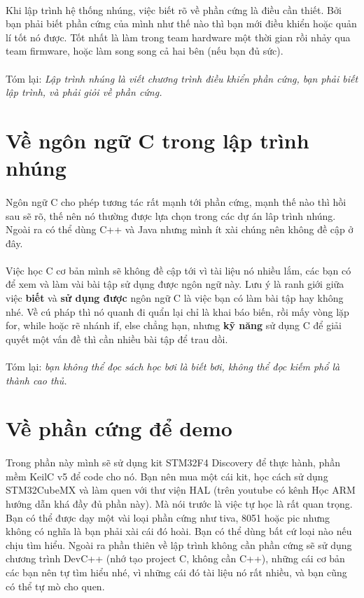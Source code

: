 \documentclass[12pt,a5paper]{book}
\begin{document}
		\paragraph{}
Khi lập trình hệ thống nhúng, việc biết rõ về phần cứng là điều cần thiết. Bởi bạn phải biết phần cứng của mình như thế nào thì bạn mới điều khiển hoặc quản lí tốt nó được. Tốt nhất là làm trong team hardware một thời gian rồi nhảy qua team firmware, hoặc làm song song cả hai bên (nếu bạn đủ sức).
		\paragraph{}
Tóm lại: \textit{Lập trình nhúng là viết chương trình điều khiển phần cứng, bạn phải biết lập trình, và phải giỏi về phần cứng.} 
	\section{Về ngôn ngữ C trong lập trình nhúng}
		\paragraph{}
	Ngôn ngữ C cho phép tương tác rất mạnh tới phần cứng, mạnh thế nào thì hồi sau sẽ rõ, thế nên nó thường được lựa chọn trong các dự án lâp trình nhúng. Ngoài ra có thể dùng C++ và Java nhưng mình ít xài chúng nên không đề cập ở đây.
		\paragraph{}
	Việc học C cơ bản mình sẽ không đề cập tới vì tài liệu nó nhiều lắm, các bạn có để xem và làm vài bài tập sử dụng được ngôn ngữ này. Lưu ý là ranh giới giữa việc \textbf{biết} và \textbf{sử dụng được} ngôn ngữ C là việc bạn có làm bài tập hay không nhé. Về cú pháp thì nó quanh đi quẩn lại chỉ là khai báo biến, rồi mấy vòng lặp for, while hoặc rẽ nhánh if, else chẳng hạn, nhưng \textbf{kỹ năng} sử dụng C để giải quyết một vấn đề thì cần nhiều bài tập để trau dồi.
		\paragraph{}
	Tóm lại: \textit{bạn không thể đọc sách học bơi là biết bơi, không thể đọc kiếm phổ là thành cao thủ.}
	\section{Về phần cứng để demo}
	\paragraph{}
	Trong phần này mình sẽ sử dụng kit STM32F4 Discovery để thực hành, phần mềm KeilC v5 để code cho nó. Bạn nên mua một cái kit, học cách sử dụng STM32CubeMX và làm quen với thư viện HAL (trên youtube có kênh Học ARM hướng dẫn khá đầy đủ phần này). Mà nói trước là việc tự học là rất quan trọng. Bạn có thể được dạy một vài loại phần cứng như tiva, 8051 hoặc pic nhưng không có nghĩa là bạn phải xài cái đó hoài. Bạn có thể dùng bất cứ loại nào nếu chịu tìm hiểu. Ngoài ra phần thiên về lập trình không cần phần cứng sẽ sử dụng chương trình DevC++ (nhớ tạo project C, không cần C++), những cái cơ bản các bạn nên tự tìm hiểu nhé, vì những cái đó tài liệu nó rất nhiều, và bạn cũng có thể tự mò cho quen.
\end{document}
